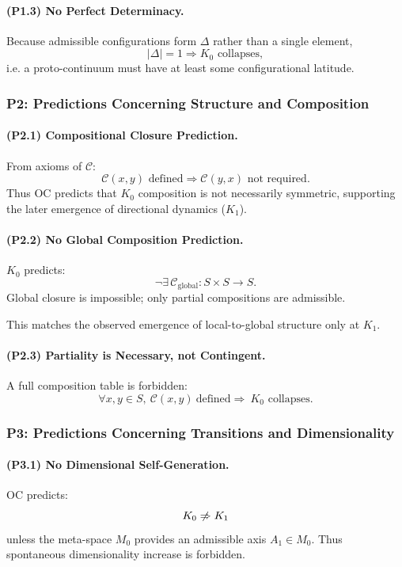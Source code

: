 \paragraph{(P1.3) No Perfect Determinacy.}
Because admissible configurations form $\Delta$ rather than a single element,
\[
|\Delta| = 1 \Rightarrow K_0 \text{ collapses},
\]
i.e. a proto-continuum must have at least some configurational latitude.

\subsubsection{P2: Predictions Concerning Structure and Composition}

\paragraph{(P2.1) Compositional Closure Prediction.}
From axioms of $\mathcal{C}$:
\[
\mathcal{C}(x,y) \text{ defined} \Rightarrow \mathcal{C}(y,x) \text{ not required}.
\]
Thus OC predicts that $K_0$ composition is not necessarily symmetric,
supporting the later emergence of directional dynamics ($K_1$).

\paragraph{(P2.2) No Global Composition Prediction.}
$K_0$ predicts:
\[
\neg \exists\, \mathcal{C}_{\mathrm{global}} : S\times S\to S.
\]
Global closure is impossible; only partial compositions are admissible.

This matches the observed emergence of local-to-global structure only at $K_1$.

\paragraph{(P2.3) Partiality is Necessary, not Contingent.}
A full composition table is forbidden:
\[
\forall x,y\in S,\ \mathcal{C}(x,y)\ \text{defined}
\Rightarrow\ K_0 \text{ collapses}.
\]

\subsubsection{P3: Predictions Concerning Transitions and Dimensionality}

\paragraph{(P3.1) No Dimensional Self-Generation.}
OC predicts:
\[
K_0 \centernot\Rightarrow K_1
\]
unless the meta-space $M_0$ provides an admissible axis $A_1\in M_0$.
Thus spontaneous dimensionality increase is forbidden.

